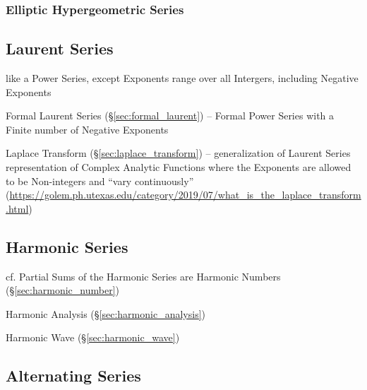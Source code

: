 \subsubsection{Elliptic Hypergeometric Series}
\label{sec:elliptic_hypergeometric}



\subsection{Laurent Series}\label{sec:laurent_series}

like a Power Series, except Exponents range over all Intergers, including
Negative Exponents

\fist Formal Laurent Series (\S\ref{sec:formal_laurent}) -- Formal Power Series
with a Finite number of Negative Exponents

\fist Laplace Transform (\S\ref{sec:laplace_transform}) -- generalization of
Laurent Series representation of Complex Analytic Functions where the Exponents
are allowed to be Non-integers and ``vary continuously''
(\url{https://golem.ph.utexas.edu/category/2019/07/what_is_the_laplace_transform.html})



\subsection{Harmonic Series}\label{sec:harmonic_series}

cf. Partial Sums of the Harmonic Series are Harmonic Numbers
(\S\ref{sec:harmonic_number})

\fist Harmonic Analysis (\S\ref{sec:harmonic_analysis})

\fist Harmonic Wave (\S\ref{sec:harmonic_wave})



\subsection{Alternating Series}\label{sec:alternating_series}

